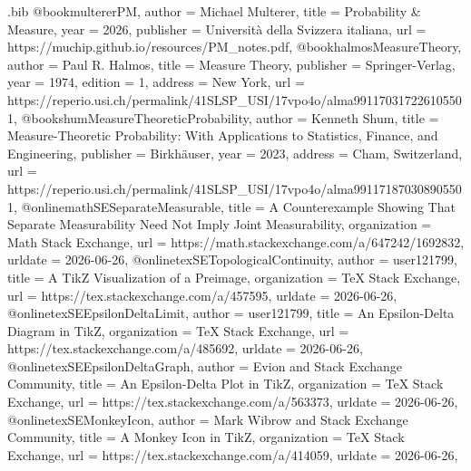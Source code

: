 
\begin{filecontents}[overwrite]{\jobname.bib}
@book{multererPM,
  author    = {Michael Multerer},
  title     = {Probability \& Measure},
  year      = {2026},
  publisher = {Universit{\`a} della Svizzera italiana},
  url       = {https://muchip.github.io/resources/PM_notes.pdf},
}
@book{halmosMeasureTheory,
  author    = {Paul R. Halmos},
  title     = {Measure Theory},
  publisher = {Springer-Verlag},
  year      = {1974},
  edition   = {1},
  address   = {New York},
  url       = {https://reperio.usi.ch/permalink/41SLSP_USI/17vpo4o/alma991170317226105501},
}
@book{shumMeasureTheoreticProbability,
  author    = {Kenneth Shum},
  title     = {Measure-Theoretic Probability: With Applications to Statistics, Finance, and Engineering},
  publisher = {Birkh{\"a}user},
  year      = {2023},
  address   = {Cham, Switzerland},
  url       = {https://reperio.usi.ch/permalink/41SLSP_USI/17vpo4o/alma991171870308905501},
}
@online{mathSESeparateMeasurable,
  title        = {A Counterexample Showing That Separate Measurability Need Not Imply Joint Measurability},
  organization = {Math Stack Exchange},
  url          = {https://math.stackexchange.com/a/647242/1692832},
  urldate      = {2026-06-26},
}
@online{texSETopologicalContinuity,
  author       = {{user121799}},
  title        = {A TikZ Visualization of a Preimage},
  organization = {TeX Stack Exchange},
  url          = {https://tex.stackexchange.com/a/457595},
  urldate      = {2026-06-26},
}
@online{texSEEpsilonDeltaLimit,
  author       = {{user121799}},
  title        = {An Epsilon-Delta Diagram in TikZ},
  organization = {TeX Stack Exchange},
  url          = {https://tex.stackexchange.com/a/485692},
  urldate      = {2026-06-26},
}
@online{texSEEpsilonDeltaGraph,
  author       = {Evion and {Stack Exchange Community}},
  title        = {An Epsilon-Delta Plot in TikZ},
  organization = {TeX Stack Exchange},
  url          = {https://tex.stackexchange.com/a/563373},
  urldate      = {2026-06-26},
}
@online{texSEMonkeyIcon,
  author       = {Mark Wibrow and {Stack Exchange Community}},
  title        = {A Monkey Icon in TikZ},
  organization = {TeX Stack Exchange},
  url          = {https://tex.stackexchange.com/a/414059},
  urldate      = {2026-06-26},
}
\end{filecontents}

\documentclass[9pt,headings=standardclasses,parskip=half, titlepage]{scrartcl}

\usepackage{ifthen,iftex,csquotes}
\usepackage[T1]{fontenc}
\usepackage[english]{babel}

